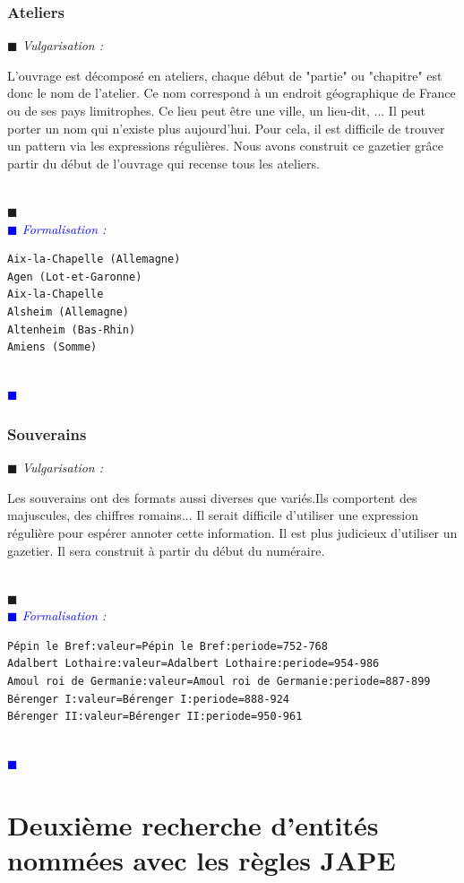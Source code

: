 \documentclass[a4paper, 11pt]{report}
\newenvironment{vulgarisation}
    {
    \textit{\textcolor{dark-blue}{$\blacksquare$  Vulgarisation : \\}}

    }
    {
    ~\\\textcolor{dark-blue}{$\blacksquare$}\\
    }
\newenvironment{formalisation}
    {
    \textit{\textcolor{blue}{$\blacksquare$  Formalisation : \\}}
    }
    {
    ~\\\textcolor{blue}{$\blacksquare$}\\
    }
\begin{document}
	\subsubsection{Ateliers}
\begin{vulgarisation}
	L'ouvrage est décomposé en ateliers, chaque début de "partie" ou "chapitre" est donc le nom de l'atelier. Ce nom correspond à un endroit géographique de France ou de ses pays limitrophes. Ce lieu peut être une ville, un lieu-dit, ... Il peut porter un nom qui n'existe plus aujourd'hui. Pour cela, il est difficile de trouver un pattern via les expressions régulières. Nous avons construit ce gazetier grâce partir du début de l'ouvrage qui recense tous les ateliers.
\end{vulgarisation}
\begin{formalisation}
\begin{verbatim}
Aix-la-Chapelle (Allemagne)
Agen (Lot-et-Garonne)
Aix-la-Chapelle
Alsheim (Allemagne)
Altenheim (Bas-Rhin)
Amiens (Somme)
\end{verbatim}
\end{formalisation}

\subsubsection{Souverains}
\begin{vulgarisation}
	Les souverains ont des formats aussi diverses que variés.Ils comportent des majuscules, des chiffres romains... Il serait difficile d'utiliser une expression régulière pour espérer annoter cette information. Il est plus judicieux d'utiliser un gazetier. Il sera construit à partir du début du numéraire. 
\end{vulgarisation}
\begin{formalisation}
\begin{verbatim}
Pépin le Bref:valeur=Pépin le Bref:periode=752-768
Adalbert Lothaire:valeur=Adalbert Lothaire:periode=954-986
Amoul roi de Germanie:valeur=Amoul roi de Germanie:periode=887-899
Bérenger I:valeur=Bérenger I:periode=888-924
Bérenger II:valeur=Bérenger II:periode=950-961
\end{verbatim}
\end{formalisation}

	\section{Deuxième recherche d'entités nommées avec les règles JAPE}
\end{document}

